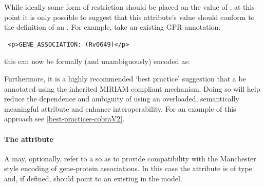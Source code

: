 \begin{newsection}
While ideally some form of restriction should be placed on the value 
of , at this point it is only possible to suggest that 
this attribute's value should conform to the definition of an 
. For example, take an existing GPR annotation:
\begin{verbatim}
 <p>GENE_ASSOCIATION: (Rv0649)</p>
\end{verbatim}
%
this can now be formally (and unambiguously) encoded as:
%

Furthermore, it is a highly recommended `best practice' suggestion that a \GeneProduct be annotated using the inherited MIRIAM compliant \SBML \Annotation mechanism. Doing so will help reduce the dependence and ambiguity of using an overloaded, semantically meaningful  attribute and enhance interoperability. For an example of this approach see \ref{best-practices-cobraV2}.

\paragraph{The  attribute}
A \GeneProduct may, optionally, refer to a \Species so as to provide compatibility with the Manchester style encoding of gene-protein associations. In this case the attribute  is of type  and, if defined, should point to an existing \Species in the model.

\end{newsection}

